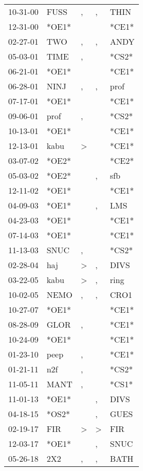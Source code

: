 \begin{supertabular}{lllll}
 10-31-00 &   FUSS &             , &             , &   THIN \\
 12-31-00 &  *OE1* &               &               &  *CE1* \\
 02-27-01 &    TWO &             , &             , &   ANDY \\
 05-03-01 &   TIME &             , &               &  *CS2* \\
 06-21-01 &  *OE1* &               &               &  *CE1* \\
 06-28-01 &   NINJ &             , &             , &   prof \\
 07-17-01 &  *OE1* &               &               &  *CE1* \\
 09-06-01 &   prof &             , &               &  *CS2* \\
 10-13-01 &  *OE1* &               &               &  *CE1* \\
 12-13-01 &   kabu &  \textgreater &               &  *CE1* \\
 03-07-02 &  *OE2* &               &               &  *CE2* \\
 05-03-02 &  *OE2* &               &             , &    sfb \\
 12-11-02 &  *OE1* &               &               &  *CE1* \\
 04-09-03 &  *OE1* &               &             , &    LMS \\
 04-23-03 &  *OE1* &               &               &  *CE1* \\
 07-14-03 &  *OE1* &               &               &  *CE1* \\
 11-13-03 &   SNUC &             , &               &  *CS2* \\
 02-28-04 &    haj &  \textgreater &             , &   DIVS \\
 03-22-05 &   kabu &  \textgreater &             , &   ring \\
 10-02-05 &   NEMO &             , &             , &   CRO1 \\
 10-27-07 &  *OE1* &               &               &  *CE1* \\
 08-28-09 &   GLOR &             , &               &  *CE1* \\
 10-24-09 &  *OE1* &               &               &  *CE1* \\
 01-23-10 &   peep &             , &               &  *CE1* \\
 01-21-11 &    n2f &             , &               &  *CS2* \\
 11-05-11 &   MANT &             , &               &  *CS1* \\
 11-01-13 &  *OE1* &               &             , &   DIVS \\
 04-18-15 &  *OS2* &               &             , &   GUES \\
 02-19-17 &    FIR &  \textgreater &  \textgreater &    FIR \\
 12-03-17 &  *OE1* &               &             , &   SNUC \\
 05-26-18 &    2X2 &             , &             , &   BATH \\
\end{supertabular}
